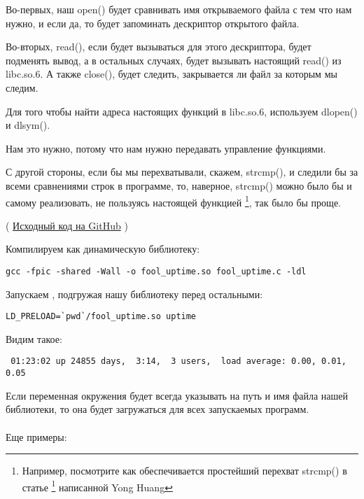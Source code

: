 Во-первых, наш open() будет сравнивать имя открываемого файла с тем что нам нужно, и если да, 
то будет запоминать дескриптор открытого файла.

Во-вторых, read(), если будет вызываться для этого дескриптора, будет подменять вывод,
а в остальных случаях, будет вызывать настоящий read() из libc.so.6.
А также close(), будет следить, закрывается ли файл за которым мы следим.

Для того чтобы найти адреса настоящих функций в libc.so.6, используем dlopen() и dlsym().

Нам это нужно, потому что нам нужно передавать управление  функциями.

С другой стороны, если бы мы перехватывали, скажем, strcmp(), и следили бы за всеми сравнениями строк в программе, 
то, наверное, strcmp() можно было бы и самому реализовать, не пользуясь настоящей функцией
\footnote{Например, посмотрите как обеспечивается простейший перехват strcmp() в статье
\footnote{\href{http://go.yurichev.com/17143}{yurichev.com}} написанной Yong Huang}, так было бы проще.


( \href{https://github.com/dennis714/RE-for-beginners/blob/master/OS/LD_PRELOAD/fool_uptime.c}{Исходный код на GitHub} )

Компилируем как динамическую библиотеку:

\begin{lstlisting}
gcc -fpic -shared -Wall -o fool_uptime.so fool_uptime.c -ldl
\end{lstlisting}

Запускаем , подгружая нашу библиотеку перед остальными:

\begin{lstlisting}
LD_PRELOAD=`pwd`/fool_uptime.so uptime
\end{lstlisting}

Видим такое:

\begin{lstlisting}
 01:23:02 up 24855 days,  3:14,  3 users,  load average: 0.00, 0.01, 0.05
\end{lstlisting}

Если переменная окружения  
будет всегда указывать на путь и имя файла нашей библиотеки, то она будет
загружаться для всех запускаемых программ.  \\
\\
Еще примеры:

